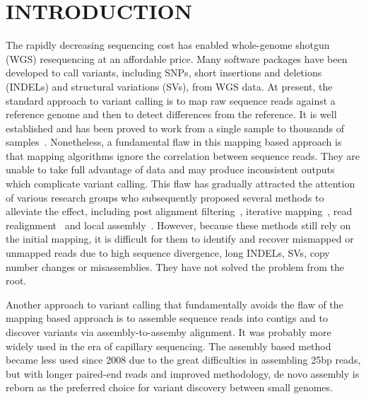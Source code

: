 \documentclass{bioinfo}
\begin{document}
\section{INTRODUCTION}

The rapidly decreasing sequencing cost has enabled whole-genome shotgun (WGS)
resequencing at an affordable price. Many software packages have been developed
to call variants, including SNPs, short insertions and deletions (INDELs) and
structural variations (SVs), from WGS data. At present, the standard approach to
variant calling is to map raw sequence reads against a reference genome and then
to detect differences from the reference. It is well established and has been
proved to work from a single sample to thousands of
samples~\citep{1000-Genomes-Project-Consortium:2010qc}. Nonetheless, a
fundamental flaw in this mapping based approach is that mapping algorithms
ignore the correlation between sequence reads. They are unable to take full
advantage of data and may produce inconsistent outputs which complicate variant
calling.  This flaw has gradually attracted the attention of various research
groups who subsequently proposed several methods to alleviate the effect,
including post alignment
filtering~\citep{Li:2008zr,Ossowski:2008if,Krawitz:2010zr}, iterative
mapping~\citep{Manske:2009ve}, read
realignment~\citep{Albers:2010ud,Homer:2010kx,Li:2011kx,Depristo:2011vn} and
local assembly~\citep{Carnevali:2011fk}.  However, because these methods still
rely on the initial mapping, it is difficult for them to identify and recover
mismapped or unmapped reads due to high sequence divergence, long INDELs, SVs,
copy number changes or misassemblies. They have not solved the problem from the
root.

Another approach to variant calling that fundamentally avoids the flaw of the
mapping based approach is to assemble sequence reads into contigs and to
discover variants via assembly-to-assemby alignment. It was probably more
widely used in the era of capillary sequencing. The assembly based method
became less used since 2008 due to the great difficulties in assembling 25bp
reads, but with longer paired-end reads and improved methodology,
de novo assembly is reborn as the preferred choice for variant discovery
between small genomes.
\end{document}
